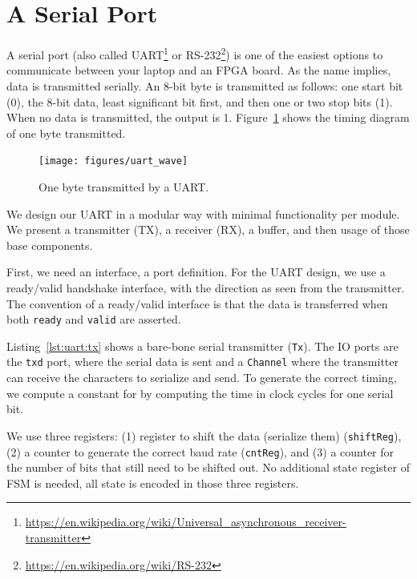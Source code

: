 \documentclass[%
    10pt,
    headinclude, footexclude,
    openright, %
    notitlepage,
    cleardoubleempty,
    headsepline,
    pointlessnumbers,
    bibtotoc, idxtotoc,
    ]{scrbook}
\newcommand{\code}[1]{{\small{\texttt{#1}}}}
\newcommand{\myref}[2]{\href{#1}{#2}}
\renewcommand{\myref}[2]{{#2}{\footnote{\url{#1}}}}
\begin{document}
\section{A Serial Port}
\label{sec:uart}

A serial port (also called
\myref{https://en.wikipedia.org/wiki/Universal_asynchronous_receiver-transmitter}{UART}
or \myref{https://en.wikipedia.org/wiki/RS-232}{RS-232}) is one of the easiest options
to communicate between your laptop and an FPGA board.
As the name implies, data is transmitted serially. An 8-bit byte is transmitted as follows:
one start bit (0), the 8-bit data, least significant bit first, and then one or two stop
bits (1). When no data is transmitted, the output is 1.
Figure~\ref{fig:uart:wave} shows the timing diagram of one byte transmitted.

\begin{figure}
  \centering
  \texttt{[image: figures/uart\_wave]}
  \caption{One byte transmitted by a UART.}
  \label{fig:uart:wave}
\end{figure}

We design our UART in a modular way with minimal functionality
per module. We present a transmitter (TX), a receiver (RX),
a buffer, and then usage of those base components.

First, we need an interface, a port definition.
For the UART design, we use a ready/valid handshake interface,
with the direction as seen from the transmitter.
The convention of a ready/valid interface is that the data is transferred
when both \code{ready} and \code{valid} are asserted.


Listing~\ref{lst:uart:tx} shows a bare-bone serial transmitter (\code{Tx}).
The IO ports are the \code{txd} port, where the serial data is sent and
a \code{Channel} where the transmitter can receive the characters to serialize
and send.
To generate the correct timing, we compute a constant for by computing
the time in clock cycles for one serial bit.

We use three registers:
(1) register to shift the data (serialize them) (\code{shiftReg}),
(2) a counter to generate the correct baud rate (\code{cntReg}), and
(3) a counter for the number of bits that still need to be shifted out.
No additional state register of FSM is needed, all state is encoded in
those three registers.
\end{document}
